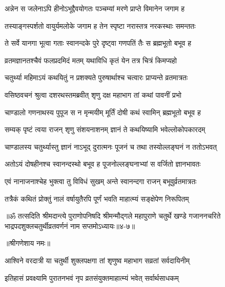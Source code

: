 \twolineshloka
{अन्नेन स जलेनाऽपि हीनोऽभूद्दैवयोगतः}
{पञ्चम्यां मरणे प्राप्ते विमानेन जगाम ह} %

\twolineshloka
{तस्याङ्गस्पर्शतो वायुर्यमलोके जगाम ह}
{तेन स्पृष्टा नरास्तत्र नरकस्थाः समन्ततः} %

\twolineshloka
{ते सर्वे यानगा भूत्वा गताः स्वानन्दके पुरे}
{दृष्ट्वा गणपतिं तैः स ब्रह्मभूतो बभूव ह} %

\twolineshloka
{व्रतमज्ञानतश्चैवं फलप्रदमिदं मतम्}
{यथाविधि कृतं येन तत्र चित्रं किमप्यहो} %

\twolineshloka
{चतुर्थ्या महिमाऽयं कथयितुं न प्रशक्यते}
{पुरुषार्थाश्च चत्वारः प्राप्यन्ते व्रतमात्रतः} %


\twolineshloka
{वसिष्ठवचनं श्रुत्वा दशरथस्तमब्रवीत्}
{श‍ृणु दक्ष महाभाग तां कथां पावनीं प्रभो} %


\twolineshloka
{चाण्डालो गणनाथस्य पुपूज स न मृन्मयीम्}
{मूर्तिं दोषी कथं स्वामिन् ब्रह्मभूतो बभूव ह} %


\twolineshloka
{सम्यक् पृष्टं त्वया राजन् श‍ृणु संशयनाशनम्}
{ज्ञानं ते कथयिष्यामि भवेल्लोकोपकारदम्} %

\twolineshloka
{चाण्डालस्य चतुर्थ्यास्तु ज्ञानं नाऽभूद् दुरात्मनः}
{पूजनं च तथा तस्योल्लङ्घनं न ततोऽभवत्} %

\twolineshloka
{अतोऽयं दोषहीनश्च स्वानन्दस्थो बभूव ह}
{पूजनोल्लङ्घनाभ्यां स वर्जितो ज्ञानभावतः} %

\twolineshloka
{एवं नानाजनाश्चेह भुक्त्वा तु विविधं सुखम्}
{अन्ते स्वानन्दगा राजन् बभूवुर्व्रतमात्रतः} %

\twolineshloka
{तत्रैकं कथितं प्रोक्तुं नालं वर्षायुतैरपि}
{पूर्णं भवति माहात्म्यं सङ्क्षेपेण निरूपितम्} %

॥ॐ तत्सदिति श्रीमदान्त्ये पुराणोपनिषदि श्रीमन्मौद्गले महापुराणे चतुर्थे खण्डे गजाननचरिते भाद्रपदशुक्लचतुर्थीव्रतवर्णनं नाम सप्तमोऽध्यायः॥४-७॥


\label{sec:ashvina-shukla-chaturthi-mahatmya-varnanam}

\centerline{॥श्रीगणेशाय नमः॥}


\twolineshloka
{आश्विने वरदात्री या चतुर्थी शुक्लपक्षगा}
{तां श‍ृणुष्व महाभाग सव्रतां सर्वदायिनीम्} %

\twolineshloka
{इतिहासं प्रवक्ष्यामि पुरातनभवं नृप}
{व्रतसंयुक्तमाहात्म्यं भवेत् सर्वार्थसाधकम्} %

